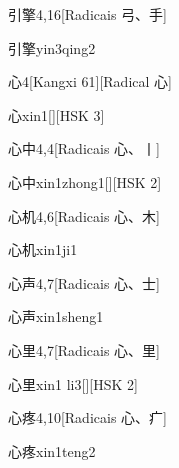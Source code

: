 \begin{entry}{引擎}{4,16}[Radicais ⼸、⼿]
  \begin{phonetics}{引擎}{yin3qing2}
  \end{phonetics}
\end{entry}

\begin{entry}{心}{4}[Kangxi 61][Radical ⼼]
  \begin{phonetics}{心}{xin1}[][HSK 3]
  \end{phonetics}
\end{entry}

\begin{entry}{心中}{4,4}[Radicais ⼼、⼁]
  \begin{phonetics}{心中}{xin1zhong1}[][HSK 2]
  \end{phonetics}
\end{entry}

\begin{entry}{心机}{4,6}[Radicais ⼼、⽊]
  \begin{phonetics}{心机}{xin1ji1}
  \end{phonetics}
\end{entry}

\begin{entry}{心声}{4,7}[Radicais ⼼、⼠]
  \begin{phonetics}{心声}{xin1sheng1}
  \end{phonetics}
\end{entry}

\begin{entry}{心里}{4,7}[Radicais ⼼、⾥]
  \begin{phonetics}{心里}{xin1 li3}[][HSK 2]
  \end{phonetics}
\end{entry}

\begin{entry}{心疼}{4,10}[Radicais ⼼、⽧]
  \begin{phonetics}{心疼}{xin1teng2}
  \end{phonetics}
\end{entry}

